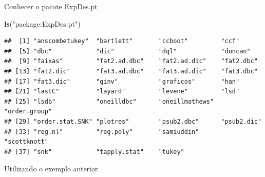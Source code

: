 \documentclass[
]{book}
\newenvironment{Shaded}{\begin{snugshade}}{\end{snugshade}}
\newcommand{\DataTypeTok}[1]{\textcolor[rgb]{0.13,0.29,0.53}{#1}}
\newcommand{\KeywordTok}[1]{\textcolor[rgb]{0.13,0.29,0.53}{\textbf{#1}}}
\newcommand{\NormalTok}[1]{#1}
\newcommand{\OperatorTok}[1]{\textcolor[rgb]{0.81,0.36,0.00}{\textbf{#1}}}
\newcommand{\StringTok}[1]{\textcolor[rgb]{0.31,0.60,0.02}{#1}}
\begin{document}
Conhecer o pacote ExpDes.pt

\begin{Shaded}
\begin{Highlighting}[]
\KeywordTok{ls}\NormalTok{(}\StringTok{"package:ExpDes.pt"}\NormalTok{)}
\end{Highlighting}
\end{Shaded}

\begin{verbatim}
##  [1] "anscombetukey"  "bartlett"       "ccboot"         "ccf"           
##  [5] "dbc"            "dic"            "dql"            "duncan"        
##  [9] "faixas"         "fat2.ad.dbc"    "fat2.ad.dic"    "fat2.dbc"      
## [13] "fat2.dic"       "fat3.ad.dbc"    "fat3.ad.dic"    "fat3.dbc"      
## [17] "fat3.dic"       "ginv"           "graficos"       "han"           
## [21] "lastC"          "layard"         "levene"         "lsd"           
## [25] "lsdb"           "oneilldbc"      "oneillmathews"  "order.group"   
## [29] "order.stat.SNK" "plotres"        "psub2.dbc"      "psub2.dic"     
## [33] "reg.nl"         "reg.poly"       "samiuddin"      "scottknott"    
## [37] "snk"            "tapply.stat"    "tukey"
\end{verbatim}

Utilizando o exemplo anterior.

\begin{Shaded}
\end{Shaded}
\end{document}

